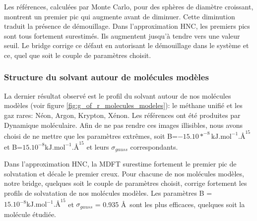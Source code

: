 Les références, calculées par Monte Carlo, pour des sphères de diamètre croissant, montrent un premier pic qui augmente avant de diminuer. Cette diminution traduit la présence de démouillage. Dans l'approximation HNC, les premiers pics sont tous fortement surestimés. Ils augmentent jusqu'à tendre vers une valeur seuil. Le bridge corrige ce défaut en autorisant le démouillage dans le système et ce, quel que soit le couple de paramètres choisit. 




\subsubsection{ Structure du solvant autour de molécules modèles}
La dernier résultat observé est le profil du solvant autour de nos molécules modèles (voir figure \ref{fig:g_of_r_molecules_modeles}): le méthane unifié et les gaz rares: Néon, Argon, Krypton, Xénon. Les références ont été produites par Dynamique moléculaire. Afin de ne pas rendre ces images illisibles, nous avons choisi de ne mettre que les paramètres extrêmes, soit B=$-15.10*^{-8} \mathrm{kJ.mol}^{-1}.\text{\AA}^{15}$ et B=$15.10^{-8} \mathrm{kJ.mol}^{-1}.\text{\AA}^{15}$ et leurs $\sigma_{gauss}$ correspondants.


Dans l'approximation HNC, la MDFT surestime fortement le premier pic de solvatation et décale le premier creux. Pour chacune de nos molécules modèles, notre bridge, quelques soit le couple de paramètres choisit, corrige fortement les profils de solvatation de nos molécules modèles. Les paramètres B = $15.10^{-8} \mathrm{kJ.mol}^{-1}.\text{\AA}^{15}$ et $\sigma_{gauss}$ = 0.935 \AA\ sont les plus efficaces, quelques soit la molécule étudiée.




